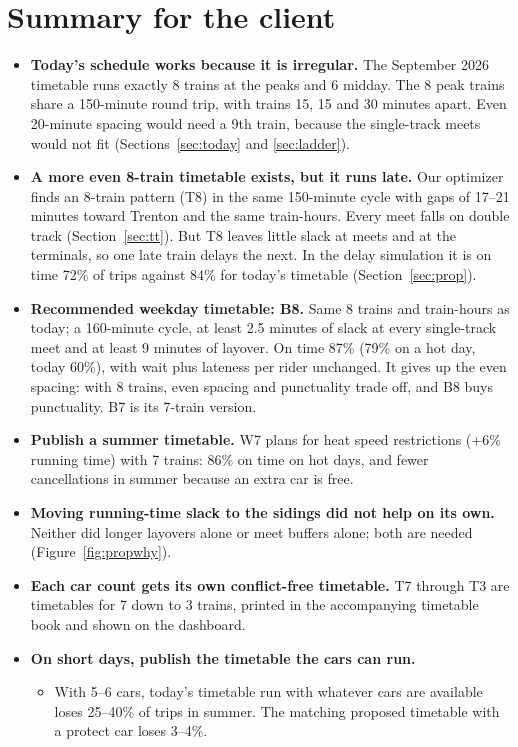 \documentclass[11pt]{article}
\begin{document}
\section{Summary for the client}
\begin{itemize}
\item \textbf{Today's schedule works because it is irregular.} The September 2026 timetable runs exactly 8 trains at the peaks and 6 midday. The 8 peak trains share a 150-minute round trip, with trains 15, 15 and 30 minutes apart. Even 20-minute spacing would need a 9th train, because the single-track meets would not fit (Sections~\ref{sec:today} and \ref{sec:ladder}).
\item \textbf{A more even 8-train timetable exists, but it runs late.} Our optimizer finds an 8-train pattern (T8) in the same 150-minute cycle with gaps of 17--21 minutes toward Trenton and the same train-hours. Every meet falls on double track (Section~\ref{sec:tt}). But T8 leaves little slack at meets and at the terminals, so one late train delays the next. In the delay simulation it is on time 72\% of trips against 84\% for today's timetable (Section~\ref{sec:prop}).
\item \textbf{Recommended weekday timetable: B8.} Same 8 trains and train-hours as today; a 160-minute cycle, at least 2.5 minutes of slack at every single-track meet and at least 9 minutes of layover. On time 87\% (79\% on a hot day, today 60\%), with wait plus lateness per rider unchanged. It gives up the even spacing: with 8 trains, even spacing and punctuality trade off, and B8 buys punctuality. B7 is its 7-train version.
\item \textbf{Publish a summer timetable.} W7 plans for heat speed restrictions (+6\% running time) with 7 trains: 86\% on time on hot days, and fewer cancellations in summer because an extra car is free.
\item \textbf{Moving running-time slack to the sidings did not help on its own.} Neither did longer layovers alone or meet buffers alone; both are needed (Figure~\ref{fig:propwhy}).
\item \textbf{Each car count gets its own conflict-free timetable.} T7 through T3 are timetables for 7 down to 3 trains, printed in the accompanying timetable book and shown on the dashboard.
\item \textbf{On short days, publish the timetable the cars can run.}
  \begin{itemize}
  \item With 5--6 cars, today's timetable run with whatever cars are available loses 25--40\% of trips in summer. The matching proposed timetable with a protect car loses 3--4\%.

\end{itemize}
\end{itemize}
\end{document}

